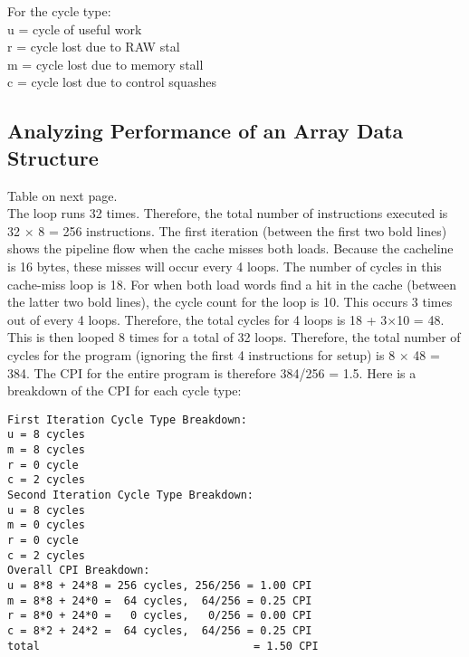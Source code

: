 \documentclass[10pt]{article}
\begin{document}
For the cycle type:\\
u = cycle of useful work\\
r = cycle lost due to RAW stal\\
m = cycle lost due to memory stall\\
c = cycle lost due to control squashes\\

\subsection{Analyzing Performance of an Array Data Structure}
Table on next page.\\
The loop runs 32 times. Therefore, the total number of instructions executed is 32 $\times$ 8 = 256 instructions. 
The first iteration (between the first two bold lines) shows the pipeline flow when the cache misses both loads. Because the cacheline is 16 bytes, these misses will occur every 4 loops. The number of cycles in this cache-miss loop is 18. For when both load words find a hit in the cache (between the latter two bold lines), the cycle count for the loop is 10. This occurs 3 times out of every 4 loops. Therefore, the total cycles for 4 loops is 18 + 3$\times$10 = 48. This is then looped 8 times for a total of 32 loops. Therefore, the total number of cycles for the program (ignoring the first 4 instructions for setup) is 8 $\times$ 48 = 384. The CPI for the entire program is therefore 384/256 = 1.5.
Here is a breakdown of the CPI for each cycle type:\\
\begin{lstlisting}
First Iteration Cycle Type Breakdown:
u = 8 cycles
m = 8 cycles
r = 0 cycle
c = 2 cycles
Second Iteration Cycle Type Breakdown:
u = 8 cycles
m = 0 cycles
r = 0 cycle
c = 2 cycles
Overall CPI Breakdown:
u = 8*8 + 24*8 = 256 cycles, 256/256 = 1.00 CPI
m = 8*8 + 24*0 =  64 cycles,  64/256 = 0.25 CPI
r = 8*0 + 24*0 =   0 cycles,   0/256 = 0.00 CPI
c = 8*2 + 24*2 =  64 cycles,  64/256 = 0.25 CPI
total                                 = 1.50 CPI
\end{lstlisting}
\end{document}
